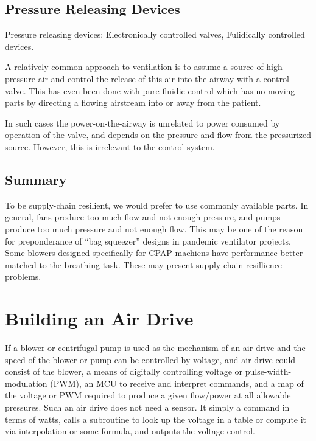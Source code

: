 \documentclass{article}
\begin{document}
\subsection{Pressure Releasing Devices}

\begin{outline}
  \1 Pressure releasing devices:
  \2 Electronically controlled valves,
  \2 Fulidically controlled devices.
\end{outline}

A relatively common approach to ventilation is to assume a source of high-pressure air and control the release of this air
into the airway with a control valve. This has even been done with pure fluidic control which has no moving parts
by directing a flowing airstream into or away from the patient.

In such cases the power-on-the-airway is unrelated to power consumed by operation of the valve, and
depends on the pressure and flow from the pressurized source. However, this is irrelevant to the control system.

\subsection{Summary}

To be supply-chain resilient, we would prefer to use commonly available parts.
In general, fans produce too much flow and not enough pressure, and pumps produce too much pressure and not enough flow.
This may be one of the reason for preponderance of ``bag squeezer'' designs in pandemic ventilator projects.
Some blowers designed specifically for CPAP machiens have performance better matched to the breathing task.
These may present supply-chain resillience problems.


\section{Building an Air Drive}

If a blower or centrifugal pump is used as the mechanism of an air drive and the speed of the
blower or pump can be controlled by voltage, and air drive could consist of the blower,
a means of digitally controlling voltage or pulse-width-modulation (PWM), an MCU to receive and interpret commands, and
a map of the voltage  or PWM required to produce a given flow/power at all allowable pressures.
Such an air drive does not need a sensor.
It simply a command in terms of watts, calls a subroutine to look up the voltage in a table
or compute it via interpolation or some formula, and outputs the voltage control.
\end{document}
